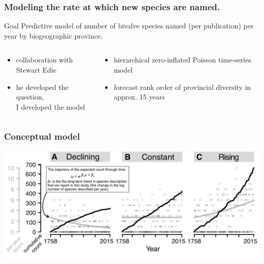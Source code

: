 \documentclass{beamer}
\begin{document}
\begin{frame}
  \frametitle{Modeling the rate at which new species are named.}

  \begin{block}{Goal}
    Predictive model of number of bivalve species named (per publication) per year by biogeographic province.
  \end{block}

  \begin{columns}
    \begin{column}{0.5\textwidth}
      \begin{itemize}
        \item collaboration with Stewart Edie
        \item he developed the question, \\I developed the model
      \end{itemize}
    \end{column}
    \begin{column}{0.5\textwidth}
      \begin{itemize}
        \item hierarchical zero-inflated Poisson time-series model
        \item forecast rank order of provincial diversity in approx. 15 years
      \end{itemize}
    \end{column}
  \end{columns}
\end{frame}

\begin{frame}
  \frametitle{Conceptual model}
  \begin{center}
    \includegraphics[width=\textwidth,height=0.8\textheight,keepaspectratio=true]{figure/edie_concept}
  \end{center}

\end{frame}
\end{document}
